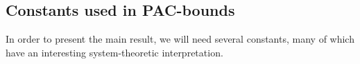 \documentclass{article}
\begin{document}
\subsection{Constants used in PAC-bounds }\label{sec:asm}
In order to present the main result,  we will need several constants, many of which have an interesting system-theoretic interpretation.

   
\end{document}
